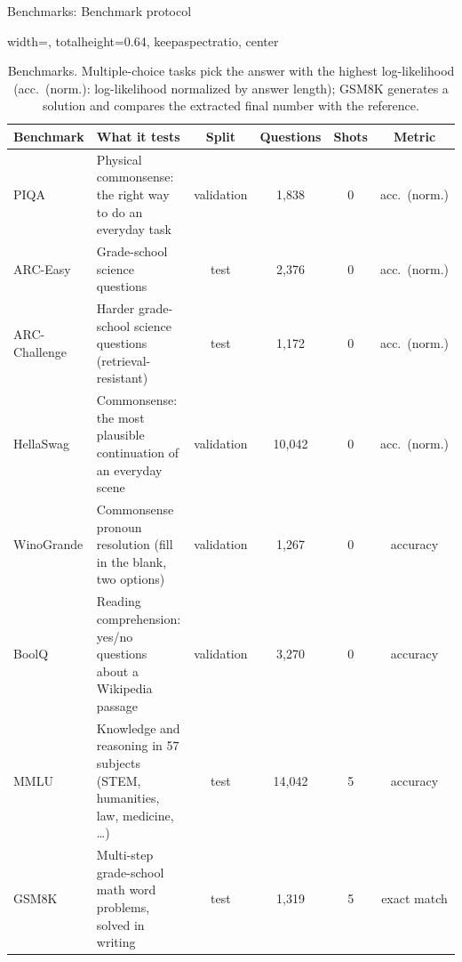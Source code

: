\documentclass[aspectratio=169,10pt]{beamer}
\begin{document}
\begin{frame}{Benchmarks: Benchmark protocol}{}
\begin{table}
\centering
\begin{adjustbox}{width=\linewidth, totalheight=0.64\textheight, keepaspectratio, center}
\centering
\footnotesize
\setlength{\tabcolsep}{4pt}
\begin{tabular}{l>{\raggedright\arraybackslash}p{7.2cm}cccc}
\toprule
Benchmark & What it tests & Split & Questions & Shots & Metric \\
\midrule
PIQA          & Physical commonsense: the right way to do an everyday task & validation & 1{,}838 & 0 & acc.\ (norm.) \\
ARC-Easy      & Grade-school science questions & test & 2{,}376 & 0 & acc.\ (norm.) \\
ARC-Challenge & Harder grade-school science questions (retrieval-resistant) & test & 1{,}172 & 0 & acc.\ (norm.) \\
HellaSwag     & Commonsense: the most plausible continuation of an everyday scene & validation & 10{,}042 & 0 & acc.\ (norm.) \\
WinoGrande    & Commonsense pronoun resolution (fill in the blank, two options) & validation & 1{,}267 & 0 & accuracy \\
BoolQ         & Reading comprehension: yes/no questions about a Wikipedia passage & validation & 3{,}270 & 0 & accuracy \\
MMLU          & Knowledge and reasoning in 57 subjects (STEM, humanities, law, medicine, \dots) & test & 14{,}042 & 5 & accuracy \\
GSM8K         & Multi-step grade-school math word problems, solved in writing & test & 1{,}319 & 5 & exact match \\
\bottomrule
\end{tabular}
\end{adjustbox}
\caption{Benchmarks. Multiple-choice tasks pick the answer with the highest log-likelihood (acc.\ (norm.):
log-likelihood normalized by answer length); GSM8K generates a solution and compares the extracted final
number with the reference.}\label{tab:protocol}
\end{table}
\end{frame}
\end{document}
